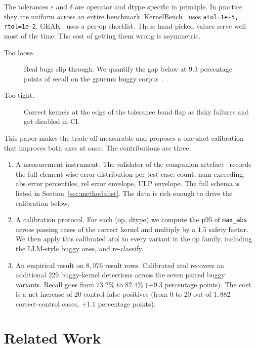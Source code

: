 \documentclass[runningheads]{llncs}
\begin{document}
The tolerances $\varepsilon$ and $\delta$ are operator and dtype
specific in principle. In practice they are uniform across an entire
benchmark. KernelBench~\cite{kernelbench2025} uses
\texttt{atol=1e-5, rtol=1e-2}. GEAK~\cite{geak2025} uses a per-op
shortlist. These hand-picked values serve well most of the time. The
cost of getting them wrong is asymmetric.

\begin{description}
\item[Too loose.] Real bugs slip through. We quantify the gap below
at $9.3$ percentage points of recall on the gpuemu buggy
corpus~\cite{gpuemuP1}.
\item[Too tight.] Correct kernels at the edge of the tolerance band
flap as flaky failures and get disabled in CI.
\end{description}

This paper makes the trade-off measurable and proposes a one-shot
calibration that improves both axes at once. The contributions are
three.

\begin{enumerate}
\item A measurement instrument. The validator of the companion
artefact~\cite{gpuemuP1} records the full element-wise error
distribution per test case: count, num-exceeding, abs error
percentiles, rel error envelope, ULP envelope. The full schema is
listed in Section~\ref{sec:method:dist}. The data is rich enough to
drive the calibration below.
\item A calibration protocol. For each (op, dtype) we compute the p95
of \texttt{max\_abs} across passing cases of the correct kernel and
multiply by a $1.5$ safety factor. We then apply this calibrated atol
to every variant in the op family, including the LLM-style buggy ones,
and re-classify.
\item An empirical result on $8{,}076$ result rows. Calibrated
atol recovers an additional 229 buggy-kernel detections across the
seven paired buggy variants. Recall goes from 73.2\% to 82.4\%
(+9.3 percentage points). The cost is a net increase of 20
control false positives (from 0 to 20 out of $1{,}882$
correct-control cases, $+1.1$ percentage points).
\end{enumerate}

\section{Related Work}
\label{sec:related}
\end{document}
